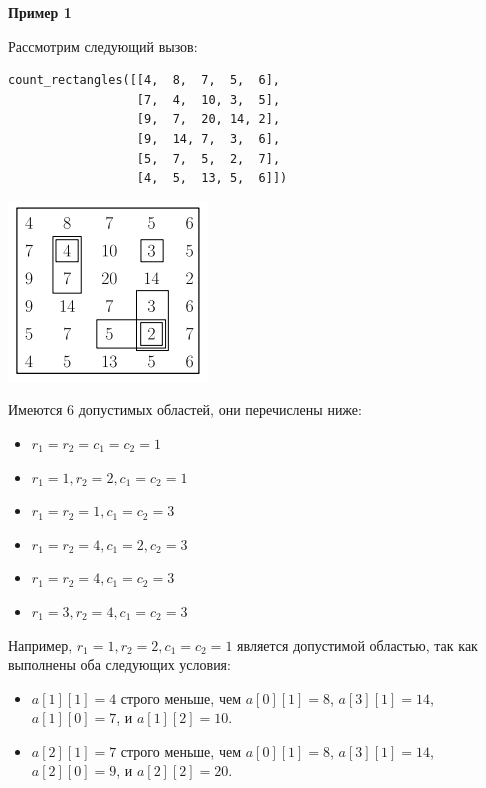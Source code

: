 \textbf{Пример 1}

Рассмотрим следующий вызов:

\begin{verbatim}
count_rectangles([[4,  8,  7,  5,  6],
                  [7,  4,  10, 3,  5],
                  [9,  7,  20, 14, 2],
                  [9,  14, 7,  3,  6],
                  [5,  7,  5,  2,  7],
                  [4,  5,  13, 5,  6]])
\end{verbatim}

\includegraphics{1.png}


Имеются $6$ допустимых областей, они перечислены ниже:
\begin{itemize}
\item $r_1 = r_2 = c_1 = c_2 = 1$
\item $r_1 = 1, r_2 = 2, c_1 = c_2 = 1$
\item $r_1 = r_2 = 1, c_1 = c_2 = 3$
\item $r_1 = r_2 = 4, c_1 = 2, c_2 = 3$
\item $r_1 = r_2 = 4, c_1 = c_2 = 3$
\item $r_1 = 3, r_2 = 4, c_1 = c_2 = 3$
\end{itemize}

Например, $r_1 = 1, r_2 = 2, c_1 = c_2 = 1$ является допустимой областью, так как
выполнены оба следующих условия:
\begin{itemize}
\item $a[1][1]=4$ строго меньше, чем $a[0][1]=8$, $a[3][1]=14$, $a[1][0]=7$, и $a[1][2]=10$.
\item $a[2][1]=7$ строго меньше, чем $a[0][1]=8$, $a[3][1]=14$, $a[2][0]=9$, и $a[2][2]=20$.
\end{itemize}
